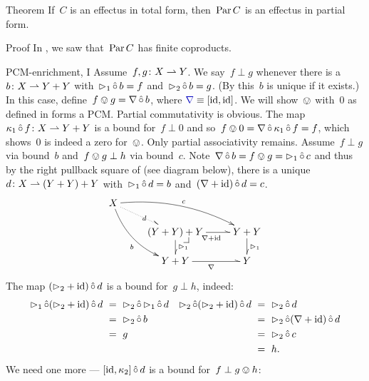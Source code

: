 \documentclass[b]{subfiles}
\begin{document}
\begin{parsec}%
\begin{point}{Theorem}%
If~$C$ is an effectus in total form,
then~$\operatorname{Par} C$ is an effectus in partial form.
\begin{point}{Proof}%
In , we saw that~$\operatorname{Par} C$ has finite coproducts.
\begin{point}{PCM-enrichment, I}%
Assume~$f,g \colon X \rightharpoonup Y$.
We say~$f \perp g$
whenever there is a ~$b\colon X \rightharpoonup Y+Y$
    with~$\mathord{\vartriangleright}_1 \mathop{\hat\circ} b = f$
    and~$\mathord{\vartriangleright}_2 \mathop{\hat\circ} b = g$.
    (By 
    this~$b$ is unique if it exists.)
In this case, define~$f \ovee g = \nabla \mathop{\hat\circ} b$,
where $\Define{\nabla} \equiv [\id,\id]$.
We will show~$\ovee$ with~$0$
    as defined in 
    forms a PCM.
Partial commutativity is obvious.
The map~$\kappa_1 \mathop{\hat\circ} f\colon X \rightharpoonup Y+Y$
    is a bound for~$f \perp 0$ and
    so~$f \ovee 0 = \nabla \mathop{\hat\circ} \kappa_1 \mathop{\hat\circ} f = f$,
    which shows~$0$
    is indeed a zero for~$\ovee$.
Only partial associativity remains.
Assume~$f \perp g$ via bound~$b$
and~$f \ovee g \perp h$ via bound~$c$.
Note~$\nabla \mathop{\hat\circ} b = f \ovee g = \mathord{\vartriangleright}_1 \mathop{\hat\circ} c$
and thus by the right pullback square of  (see diagram below),
    there is a unique~$d\colon X \rightharpoonup (Y+Y)+Y$
    with~$\mathord{\vartriangleright}_1 \mathop{\hat\circ} d = b$ and~$(\nabla +\operatorname{id})\mathop{\hat\circ} d = c$.
\begin{equation*}
    \xymatrix@R-.8pc{
    X \ar@^{.>}[rd]|d
        \ar@/^1pc/[rrd]^c
        \ar@/_1pc/[rdd]_b
        \\& (Y+Y)+Y \pullback
        \ar@^{>}[r]_{\nabla+\id}
        \ar@^{>}[d]^{\pproj_1}
    & Y+Y
        \ar@^{>}[d]^{\pproj_1}
    \\& Y+Y
        \ar@^{>}[r]_{\nabla}
&Y
}
\end{equation*}
The map $(\mathord{\vartriangleright}_2 + \operatorname{id}) \mathop{\hat\circ} d$
    is a bound for~$g \perp h$,
    indeed:
\begin{align*}
    \mathord{\vartriangleright}_1 \mathop{\hat\circ} (\mathord{\vartriangleright}_2 + \operatorname{id}) \mathop{\hat\circ} d
    & \ =\  \mathord{\vartriangleright}_2 \mathop{\hat\circ} \mathord{\vartriangleright}_1 \mathop{\hat\circ} d 
    & \mathord{\vartriangleright}_2 \mathop{\hat\circ} (\mathord{\vartriangleright}_2 + \operatorname{id}) \mathop{\hat\circ} d
    & \ =\  \mathord{\vartriangleright}_2 \mathop{\hat\circ} d
    \\
    &\ =\  \mathord{\vartriangleright}_2 \mathop{\hat\circ} b
    && \ =\  \mathord{\vartriangleright}_2 \mathop{\hat\circ} (\nabla + \operatorname{id}) \mathop{\hat\circ} d
    \\
    & \ =\  g
    && \ = \ \mathord{\vartriangleright}_2 \mathop{\hat\circ} c\\
    &&& \ = \ h.
\end{align*}
We need one more ---
    $[\operatorname{id},\kappa_2]\mathop{\hat\circ} d$ is a bound for~$f \perp g \ovee h$:

\end{point}
\end{point}
\end{point}
\end{parsec}
\end{document}
